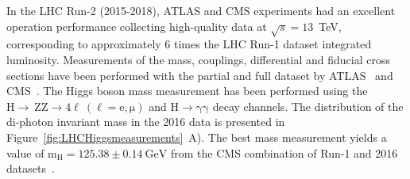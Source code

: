 In the LHC Run-2 (2015-2018), ATLAS and CMS experiments had an excellent operation performance collecting high-quality data at $\sqrt{s}=13$~TeV, corresponding to approximately 6 times the LHC Run-1 dataset integrated luminosity. Measurements of the mass, couplings, differential and fiducial cross sections have been performed with the partial and full dataset by ATLAS~\cite{atlasrun2mes,atlasrun2hmass} and CMS~\cite{cmsrun2mes,cmsbesthmassrun2}. The Higgs boson mass measurement has been performed using the $\mathrm{H\rightarrow~ZZ\rightarrow 4\ell~(\ell=e,\mu)}$ and $\mathrm{H\rightarrow\gamma\gamma}$ decay channels. The distribution of the di-photon invariant mass in the 2016 data is presented in Figure~\ref{fig:LHCHiggsmeasurements}~A). The best mass measurement yields a value of $\mathrm{m_{H}=125.38\pm0.14~GeV}$ from the CMS combination of Run-1 and 2016 datasets~\cite{cmsbesthmassrun2}. 

